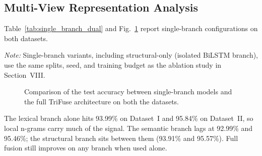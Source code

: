 \subsection{Multi-View Representation Analysis}

Table~\ref{tab:single_branch_dual} and Fig.~\ref{fig:feature_effect} report single-branch configurations on both datasets.

\begin{table}[!t]
\caption{Single-Branch Performance}
\label{tab:single_branch_dual}
\centering
{}
\vspace{2pt}
{\footnotesize \textit{Note:} Single-branch variants, including structural-only (isolated BiLSTM branch), use the same splits, seed, and training budget as the ablation study in Section~VIII.}
\end{table}

\begin{figure}[!t]
\centering

\caption{Comparison of the test accuracy between single-branch models and the full TriFuse architecture on both the datasets.}
\label{fig:feature_effect}
\end{figure}

The lexical branch alone hits 93.99\% on Dataset~I and 95.84\% on Dataset~II, so local n-grams carry much of the signal. The semantic branch lags at 92.99\% and 95.46\%; the structural branch sits between them (93.91\% and 95.57\%). Full fusion still improves on any branch when used alone.
